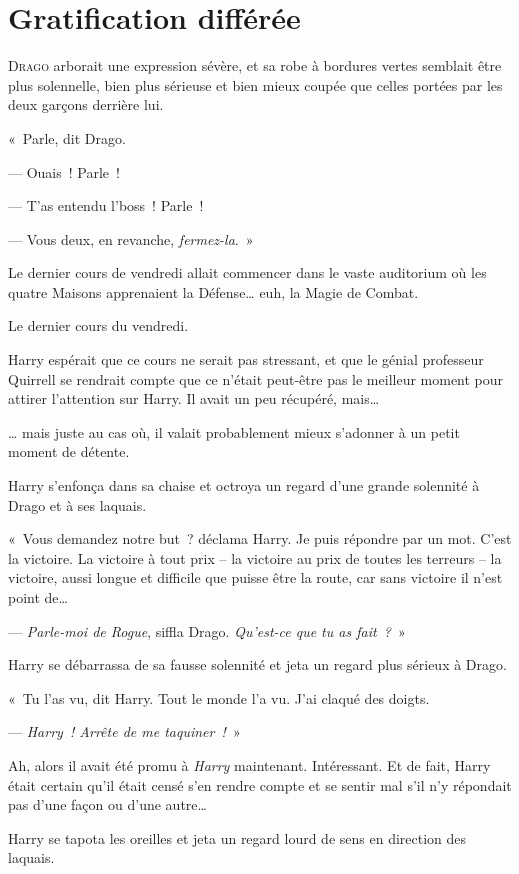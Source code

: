 \chapter{Gratification différée}

\lettrine{D}{rago} arborait une expression sévère, et sa robe à bordures vertes semblait être plus solennelle, bien plus sérieuse et bien mieux coupée que celles portées par les deux garçons derrière lui.

«~Parle, dit Drago.

--- Ouais~! Parle~!

--- T'as entendu l'boss~! Parle~!

--- Vous deux, en revanche, \emph{fermez-la}.~»

Le dernier cours de vendredi allait commencer dans le vaste auditorium où les quatre Maisons apprenaient la Défense… euh, la Magie de Combat.

Le dernier cours du vendredi.

Harry espérait que ce cours ne serait pas stressant, et que le génial professeur Quirrell se rendrait compte que ce n'était peut-être pas le meilleur moment pour attirer l'attention sur Harry. Il avait un peu récupéré, mais…

… mais juste au cas où, il valait probablement mieux s'adonner à un petit moment de détente.

Harry s'enfonça dans sa chaise et octroya un regard d'une grande solennité à Drago et à ses laquais.

«~Vous demandez notre but~? déclama Harry. Je puis répondre par un mot. C'est la victoire. La victoire à tout prix -- la victoire au prix de toutes les terreurs -- la victoire, aussi longue et difficile que puisse être la route, car sans victoire il n'est point de…

--- \emph{Parle-moi de Rogue}, siffla Drago. \emph{Qu'est-ce que tu as fait~?}~»

Harry se débarrassa de sa fausse solennité et jeta un regard plus sérieux à Drago.

«~Tu l'as vu, dit Harry. Tout le monde l'a vu. J'ai claqué des doigts.

--- \emph{Harry~! Arrête de me taquiner~!}~»

Ah, alors il avait été promu à \emph{Harry} maintenant. Intéressant. Et de fait, Harry était certain qu'il était censé s'en rendre compte et se sentir mal s'il n'y répondait pas d'une façon ou d'une autre…

Harry se tapota les oreilles et jeta un regard lourd de sens en direction des laquais.

